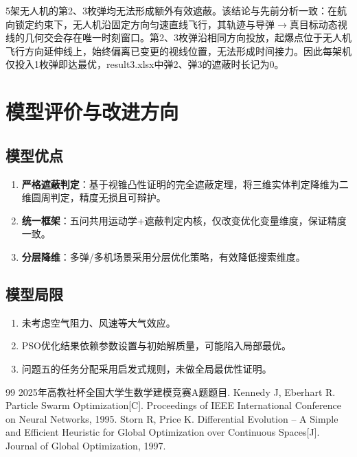 \documentclass[12pt,a4paper]{article}
\begin{document}
5架无人机的第2、3枚弹均无法形成额外有效遮蔽。该结论与先前分析一致：在航向锁定约束下，无人机沿固定方向匀速直线飞行，其轨迹与导弹$\to$真目标动态视线的几何交会存在唯一时刻窗口。第2、3枚弹沿相同方向投放，起爆点位于无人机飞行方向延伸线上，始终偏离已变更的视线位置，无法形成时间接力。因此每架机仅投入1枚弹即达最优，result3.xlsx中弹2、弹3的遮蔽时长记为0。

\section{模型评价与改进方向}

\subsection{模型优点}
\begin{enumerate}[nosep]
  \item \textbf{严格遮蔽判定}：基于视锥凸性证明的完全遮蔽定理，将三维实体判定降维为二维圆周判定，精度无损且可辩护。
  \item \textbf{统一框架}：五问共用运动学+遮蔽判定内核，仅改变优化变量维度，保证精度一致。
  \item \textbf{分层降维}：多弹/多机场景采用分层优化策略，有效降低搜索维度。
\end{enumerate}

\subsection{模型局限}
\begin{enumerate}[nosep]
  \item 未考虑空气阻力、风速等大气效应。
  \item PSO优化结果依赖参数设置与初始解质量，可能陷入局部最优。
  \item 问题五的任务分配采用启发式规则，未做全局最优性证明。
\end{enumerate}

\begin{thebibliography}{99}
 2025年高教社杯全国大学生数学建模竞赛A题题目.
 Kennedy J, Eberhart R. Particle Swarm Optimization[C]. Proceedings of IEEE International Conference on Neural Networks, 1995.
 Storn R, Price K. Differential Evolution -- A Simple and Efficient Heuristic for Global Optimization over Continuous Spaces[J]. Journal of Global Optimization, 1997.
\end{thebibliography}
\end{document}
